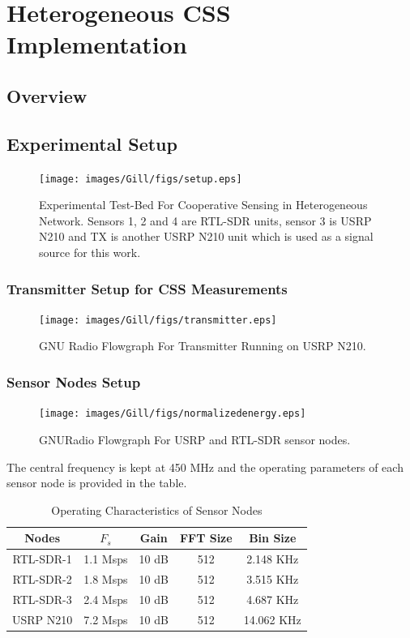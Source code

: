 \chapter{Heterogeneous CSS Implementation}
\label{chapter4}


\section{Overview}

\section{Experimental Setup}

\begin{figure}[ht!]
	\centering
	\texttt{[image: images/Gill/figs/setup.eps]}
    \caption{Experimental Test-Bed For Cooperative Sensing in Heterogeneous Network. Sensors 1, 2 and 4 are RTL-SDR units, sensor 3 is USRP N210 and TX is another USRP N210 unit which is used as a signal source for this work.} 
\label{expsetup}      
\end{figure}

\subsection{Transmitter Setup for CSS Measurements}
\begin{figure}[ht!]
	\centering
	\texttt{[image: images/Gill/figs/transmitter.eps]}
    \caption{GNU Radio Flowgraph For Transmitter Running on USRP N210.} 
\label{expsetup}      
\end{figure}

\subsection{Sensor Nodes Setup}

\begin{figure}[ht!]
	\centering
	\texttt{[image: images/Gill/figs/normalizedenergy.eps]}
    \caption{GNURadio Flowgraph For USRP and RTL-SDR sensor nodes.} 
\label{expsetup}      
\end{figure}

The central frequency is kept at 450 MHz and the operating parameters of each sensor node is provided in the table.
\begin{table}[!ht]
\caption{Operating Characteristics of Sensor Nodes}
\centering
\vspace{-5pt}
\begin{tabular}{|c | c | c | c | c|}
\hline
Nodes      & $F_s$     & Gain  & FFT Size &  Bin Size \\ \hline
RTL-SDR-1  & 1.1 Msps  & 10 dB & 512      & 2.148 KHz \\ \hline
RTL-SDR-2  & 1.8 Msps  & 10 dB & 512      & 3.515 KHz\\ \hline
RTL-SDR-3  & 2.4 Msps  & 10 dB & 512      & 4.687 KHz\\ \hline
USRP N210  & 7.2 Msps  & 10 dB & 512     &  14.062 KHz\\ 
\hline
\end{tabular}
\vspace{-5pt}
\label{table1}
\end{table}

